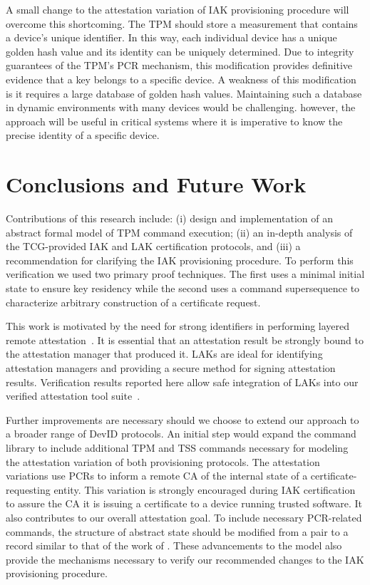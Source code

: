 \documentclass[runningheads]{llncs}
\begin{document}
A small change to the attestation variation of IAK provisioning
procedure will overcome this shortcoming. The TPM should store a
measurement that contains a device's unique identifier. In this way,
each individual device has a unique golden hash value and its identity
can be uniquely determined.  Due to integrity guarantees of the TPM's
PCR mechanism, this modification provides definitive evidence that a
key belongs to a specific device. A weakness of this modification
is it requires a large database of golden hash values. Maintaining
such a database in dynamic environments with many devices would be
challenging.  however, the approach will be useful in critical systems
where it is imperative to know the precise identity of a specific
device.
%
%
%
\section{Conclusions and Future Work}

Contributions of this research include: (i) design and implementation
of an abstract formal model of TPM command execution; (ii) an in-depth
analysis of the TCG-provided IAK and LAK certification protocols,
and (iii) a recommendation for clarifying the IAK provisioning
procedure.  To perform this verification we used two primary proof
techniques.  The first uses a minimal initial state to ensure key
residency while the second uses a command supersequence to characterize
arbitrary construction of a certificate request.

This work is motivated by the need for strong identifiers in
performing layered remote
attestation~\cite{Coker::Principles-of-R,Ramsdell:2019aa,helble2021flexible}.
It is essential that an attestation result be strongly bound to the
attestation manager that produced it. LAKs are ideal for identifying
attestation managers and providing a secure method for signing
attestation results.  Verification results reported here allow safe
integration of LAKs into our verified attestation tool
suite~\cite{petz2022innovations}.

Further improvements are necessary should we choose to extend our
approach to a broader range of DevID protocols.  An initial step would
expand the command library to include additional TPM and TSS commands
necessary for modeling the attestation variation of both provisioning
protocols. The attestation variations use PCRs to inform a remote CA
of the internal state of a certificate-requesting entity. This
variation is strongly encouraged during IAK certification to assure
the CA it is issuing a certificate to a device running trusted
software.  It also contributes to our overall attestation goal.  To
include necessary PCR-related commands, the structure of abstract
state should be modified from a pair to a record similar to that of
the work of \citet{PrivacyCAAnalysis-Hall}. These advancements to the
model also provide the mechanisms necessary to verify our recommended
changes to the IAK provisioning procedure.
\end{document}
